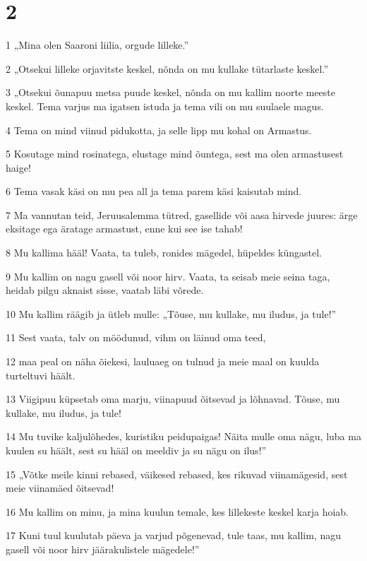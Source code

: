 \chapter{2}

\par 1 „Mina olen Saaroni liilia, orgude lilleke.”
\par 2 „Otsekui lilleke orjavitste keskel, nõnda on mu kullake tütarlaste keskel.”
\par 3 „Otsekui õunapuu metsa puude keskel, nõnda on mu kallim noorte meeste keskel. Tema varjus ma igatsen istuda ja tema vili on mu suulaele magus.
\par 4 Tema on mind viinud pidukotta, ja selle lipp mu kohal on Armastus.
\par 5 Kosutage mind rosinatega, elustage mind õuntega, sest ma olen armastusest haige!
\par 6 Tema vasak käsi on mu pea all ja tema parem käsi kaisutab mind.
\par 7 Ma vannutan teid, Jeruusalemma tütred, gasellide või aasa hirvede juures: ärge eksitage ega äratage armastust, enne kui see ise tahab!
\par 8 Mu kallima hääl! Vaata, ta tuleb, ronides mägedel, hüpeldes küngastel.
\par 9 Mu kallim on nagu gasell või noor hirv. Vaata, ta seisab meie seina taga, heidab pilgu aknaist sisse, vaatab läbi võrede.
\par 10 Mu kallim räägib ja ütleb mulle: „Tõuse, mu kullake, mu iludus, ja tule!”
\par 11 Sest vaata, talv on möödunud, vihm on läinud oma teed,
\par 12 maa peal on näha õiekesi, lauluaeg on tulnud ja meie maal on kuulda turteltuvi häält.
\par 13 Viigipuu küpsetab oma marju, viinapuud õitsevad ja lõhnavad. Tõuse, mu kullake, mu iludus, ja tule!
\par 14 Mu tuvike kaljulõhedes, kuristiku peidupaigas! Näita mulle oma nägu, luba ma kuulen su häält, sest su hääl on meeldiv ja su nägu on ilus!”
\par 15 „Võtke meile kinni rebased, väikesed rebased, kes rikuvad viinamägesid, sest meie viinamäed õitsevad!
\par 16 Mu kallim on minu, ja mina kuulun temale, kes lillekeste keskel karja hoiab.
\par 17 Kuni tuul kuulutab päeva ja varjud põgenevad, tule taas, mu kallim, nagu gasell või noor hirv jäärakulistele mägedele!”

